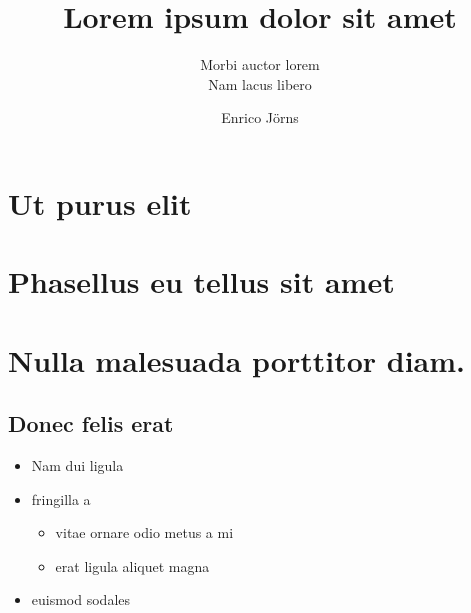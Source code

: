 \documentclass[a4paper,twoside,bcor=8mm,extramargin]{tubsartcl}
\title{Lorem ipsum dolor sit amet}
\subtitle{Morbi auctor lorem\vphantom{g}\\ %
Nam lacus libero}
\author{Enrico Jörns}
\begin{document}
\maketitle[image]
\pagestyle{scrheadings}
\tableofcontents


\section{Ut purus elit}

\lipsum[1]

% 

\section{Phasellus eu tellus sit amet}

\lipsum[2-5]

\section{Nulla malesuada porttitor diam.}

\lipsum[1-3]

\subsection{Donec felis erat}

\lipsum[4-7]

\begin{itemize}
  \item Nam dui ligula
  \item fringilla a
    \begin{itemize}
      \item vitae ornare odio metus a mi
      \item erat ligula aliquet magna
    \end{itemize}
  \item euismod sodales
\end{itemize}
\end{document}
